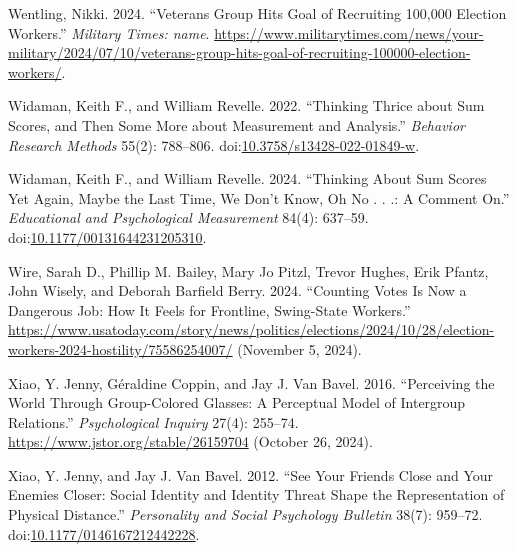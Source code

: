 \documentclass[
  12pt,
  letterpaper,
]{article}
\newlength{\cslhangindent}
\newenvironment{CSLReferences}[2] %
 {\begin{list}{}{%
  \setlength{\itemindent}{0pt}
  \setlength{\leftmargin}{0pt}
  \setlength{\parsep}{0pt}
  \ifodd #1
   \setlength{\leftmargin}{\cslhangindent}
   \setlength{\itemindent}{-1\cslhangindent}
  \fi
  \setlength{\itemsep}{#2\baselineskip}}}
 {\end{list}}
\begin{document}
\begin{CSLReferences}{1}{1}
Wentling, Nikki. 2024. {``Veterans Group Hits Goal of Recruiting 100,000
Election Workers.''} \emph{Military Times: name}.
\url{https://www.militarytimes.com/news/your-military/2024/07/10/veterans-group-hits-goal-of-recruiting-100000-election-workers/}.

Widaman, Keith F., and William Revelle. 2022. {``Thinking Thrice about
Sum Scores, and Then Some More about Measurement and Analysis.''}
\emph{Behavior Research Methods} 55(2): 788--806.
doi:\href{https://doi.org/10.3758/s13428-022-01849-w}{10.3758/s13428-022-01849-w}.

Widaman, Keith F., and William Revelle. 2024. {``Thinking {About Sum
Scores Yet Again}, {Maybe} the {Last Time}, {We Don}'t {Know}, {Oh No} .
. .: {A Comment} On.''} \emph{Educational and Psychological Measurement}
84(4): 637--59.
doi:\href{https://doi.org/10.1177/00131644231205310}{10.1177/00131644231205310}.

Wire, Sarah D., Phillip M. Bailey, Mary Jo Pitzl, Trevor Hughes, Erik
Pfantz, John Wisely, and Deborah Barfield Berry. 2024. {``Counting Votes
Is Now a Dangerous Job: How It Feels for Frontline, Swing-State
Workers.''}
\url{https://www.usatoday.com/story/news/politics/elections/2024/10/28/election-workers-2024-hostility/75586254007/}
(November 5, 2024).

Xiao, Y. Jenny, Géraldine Coppin, and Jay J. Van Bavel. 2016.
{``Perceiving the {World Through Group-Colored Glasses}: {A Perceptual
Model} of {Intergroup Relations}.''} \emph{Psychological Inquiry} 27(4):
255--74. \url{https://www.jstor.org/stable/26159704} (October 26, 2024).

Xiao, Y. Jenny, and Jay J. Van Bavel. 2012. {``See {Your Friends Close}
and {Your Enemies Closer}: {Social Identity} and {Identity Threat Shape}
the {Representation} of {Physical Distance}.''} \emph{Personality and
Social Psychology Bulletin} 38(7): 959--72.
doi:\href{https://doi.org/10.1177/0146167212442228}{10.1177/0146167212442228}.

\end{CSLReferences}
\end{document}
